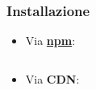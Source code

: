 
        \begin{frame}[fragile]{\insertsectionhead}
        \subsubsection{Installazione}\label{subsec:install}
        \begin{block}{\insertsubsubsectionhead}
            \begin{itemize}
                \item
                    Via \textbf{\url{npm}}:
                    \inputminted[fontsize=\scriptsize]{text}{res/npm_install.sh}
                \item
                    Via \textbf{\footnotesize CDN}:
                    \inputminted[fontsize=\scriptsize]{text}{res/cdn_install.html}
            \end{itemize}
        \end{block}
        \end{frame}

